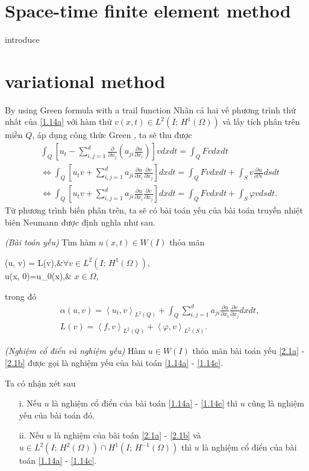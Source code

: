 \documentclass[]{article}
\begin{document}
\section{Space-time finite element method}
introduce
\section{variational method}
By using Green formula with a trail function
\qquad Nhân cả hai vế phương trình thứ nhất của \eqref{1.14a} với hàm thử $v(x, t)\in L^2(I;\, H^1(\Omega))$ và lấy tích phân trên miền $Q$, áp dụng công thức Green \cite{b6}, ta sẽ thu được
\begin{align*}
	&\int_{Q}\left[u_t-\sum_{i, j=1}^{d}\frac{\partial}{\partial x_j}\left(a_{ji}\frac{\partial u}{\partial x_i}\right)\right]vdxdt=\int_{Q}Fvdxdt\\
	&\Leftrightarrow\int_{Q}\left[u_tv+\sum_{i, j=1}^{d}a_{ji}\frac{\partial u}{\partial x_i}\frac{\partial v}{\partial x_j}\right]dxdt=\int_{Q}Fvdxdt+\int_{S}v\frac{\partial u}{\partial \mathcal{N}}dsdt\\
	&\Leftrightarrow\int_{Q}\left[u_tv+\sum_{i, j=1}^{d}a_{ji}\frac{\partial u}{\partial x_i}\frac{\partial v}{\partial x_j}\right]dxdt=\int_{Q}Fvdxdt+\int_{S}\varphi vdsdt.
\end{align*}
Từ phương trình biến phân trên, ta sẽ có bài toán yếu của bài toán truyền nhiệt biên Neumann được định nghĩa như sau.
\begin{dn}{\textit{(Bài toán yếu)}}\label{dn2.1}
	Tìm hàm $u(x, t)\in W(I)$ thỏa mãn
	\begin{subnumcases}{}
		\alpha(u, v) = L(v),&$\forall v\in L^2(I;\, H^1(\Omega))$,\label{2.1a}\\
		u(x, 0)=u_0(x),& $x\in \Omega$, \label{2.1b}
	\end{subnumcases}
	trong đó
	\begin{align*}
		&\alpha(u, v) = \left\langle u_t, v\right\rangle_{L^2(Q)}+\int_{Q}\sum_{i, j=1}^{d}a_{ji}\frac{\partial u}{\partial x_i}\frac{\partial v}{\partial x_j}dxdt,\\
		&L(v)=\left\langle f, v\right\rangle_{L^2(Q)}+\left\langle \varphi, v\right\rangle_{L^2(S)}.
	\end{align*}
\end{dn}
\begin{dn}{\textit{(Nghiệm cổ điển và nghiệm yếu)}}\label{dn2.2}
	Hàm $u\in W(I)$ thỏa mãn bài toán yếu \eqref{2.1a} - \eqref{2.1b} được gọi là nghiệm yếu của bài toán \eqref{1.14a} - \eqref{1.14c}. 
\end{dn}
\begin{nx}Ta có nhận xét sau
	\begin{itemize}
		\item[i.] Nếu $u$ là nghiệm cổ điển của bài toán \eqref{1.14a} - \eqref{1.14c} thì $u$ cũng là nghiệm yếu của bài toán đó.
		\item[ii.] Nếu $u$ là nghiệm của bài toán \eqref{2.1a} - \eqref{2.1b} và $u\in L^2\left(I;\, H^2(\Omega)\right)\cap H^1\left(I;\, H^{-1}(\Omega)\right)$ thì $u$ là nghiệm cổ điển của bài toán \eqref{1.14a} - \eqref{1.14c}.
	\end{itemize}
\end{nx}
\end{document}
